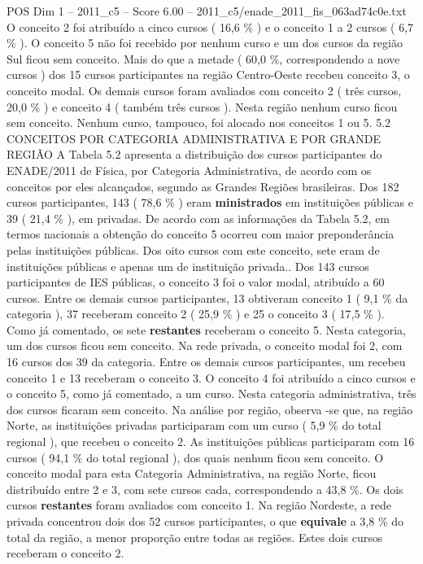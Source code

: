 \begin{textsample}{POS Dim 1 – 2011\_c5 – Score 6.00 – 2011\_c5/enade\_2011\_fis\_063ad74c0e.txt}
O conceito 2 foi atribuído a cinco cursos ( 16,6 \% ) e o conceito 1 a 2 cursos ( 6,7 \% ).
O conceito 5 não foi recebido por nenhum curso e um dos cursos da região Sul ficou sem conceito.
Mais do que a metade ( 60,0 \%, correspondendo a nove cursos ) dos 15 cursos participantes na região Centro-Oeste recebeu conceito 3, o conceito modal.
Os demais cursos foram avaliados com conceito 2 ( três cursos, 20,0 \% ) e conceito 4 ( também três cursos ).
Nesta região nenhum curso ficou sem conceito.
Nenhum curso, tampouco, foi alocado nos conceitos 1 ou 5. 5.2 CONCEITOS POR CATEGORIA ADMINISTRATIVA E POR GRANDE REGIÃO A Tabela 5.2 apresenta a distribuição dos cursos participantes do ENADE/2011 de Física, por Categoria Administrativa, de acordo com os conceitos por eles alcançados, segundo as Grandes Regiões brasileiras.
Dos 182 cursos participantes, 143 ( 78,6 \% ) eram \textbf{ministrados} em instituições públicas e 39 ( 21,4 \% ), em privadas.
De acordo com as informações da Tabela 5.2, em termos nacionais a obtenção do conceito 5 ocorreu com maior preponderância pelas instituições públicas.
Dos oito cursos com este conceito, sete eram de instituições públicas e apenas um de instituição privada..
Dos 143 cursos participantes de IES públicas, o conceito 3 foi o valor modal, atribuído a 60 cursos.
Entre os demais cursos participantes, 13 obtiveram conceito 1 ( 9,1 \% da categoria ), 37 receberam conceito 2 ( 25,9 \% ) e 25 o conceito 3 ( 17,5 \% ).
Como já comentado, os sete \textbf{restantes} receberam o conceito 5.
Nesta categoria, um dos cursos ficou sem conceito.
Na rede privada, o conceito modal foi 2, com 16 cursos dos 39 da categoria.
Entre os demais cursos participantes, um recebeu conceito 1 e 13 receberam o conceito 3.
O conceito 4 foi atribuído a cinco cursos e o conceito 5, como já comentado, a um curso.
Nesta categoria administrativa, três dos cursos ficaram sem conceito.
Na análise por região, observa -se que, na região Norte, as instituições privadas participaram com um curso ( 5,9 \% do total regional ), que recebeu o conceito 2.
As instituições públicas participaram com 16 cursos ( 94,1 \% do total regional ), dos quais nenhum ficou sem conceito.
O conceito modal para esta Categoria Administrativa, na região Norte, ficou distribuído entre 2 e 3, com sete cursos cada, correspondendo a 43,8 \%.
Os dois cursos \textbf{restantes} foram avaliados com conceito 1.
Na região Nordeste, a rede privada concentrou dois dos 52 cursos participantes, o que \textbf{equivale} a 3,8 \% do total da região, a menor proporção entre todas as regiões.
Estes dois cursos receberam o conceito 2.

\end{textsample}
